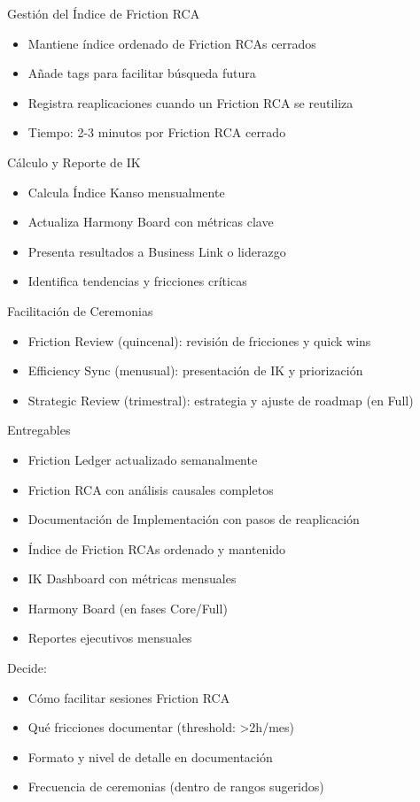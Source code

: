 Gestión del Índice de Friction RCA
\begin{itemize}
    \item Mantiene índice ordenado de Friction RCAs cerrados
    \item Añade tags para facilitar búsqueda futura
    \item Registra reaplicaciones cuando un Friction RCA se reutiliza
    \item Tiempo: 2-3 minutos por Friction RCA cerrado
\end{itemize}

Cálculo y Reporte de IK
\begin{itemize}
    \item Calcula Índice Kanso mensualmente
    \item Actualiza Harmony Board con métricas clave
    \item Presenta resultados a Business Link o liderazgo
    \item Identifica tendencias y fricciones críticas
\end{itemize}

Facilitación de Ceremonias
\begin{itemize}
    \item Friction Review (quincenal): revisión de fricciones y quick wins
    \item Efficiency Sync (menusual): presentación de IK y priorización
    \item Strategic Review (trimestral): estrategia y ajuste de roadmap (en Full)
\end{itemize}

Entregables
\begin{itemize}
    \item Friction Ledger actualizado semanalmente
    \item Friction RCA con análisis causales completos
    \item Documentación de Implementación con pasos de reaplicación
    \item Índice de Friction RCAs ordenado y mantenido
    \item IK Dashboard con métricas mensuales
    \item Harmony Board (en fases Core/Full)
    \item Reportes ejecutivos mensuales
\end{itemize}

Decide:
\begin{itemize}
    \item Cómo facilitar sesiones Friction RCA
    \item Qué fricciones documentar (threshold: >2h/mes)
    \item Formato y nivel de detalle en documentación
    \item Frecuencia de ceremonias (dentro de rangos sugeridos)
\end{itemize}


